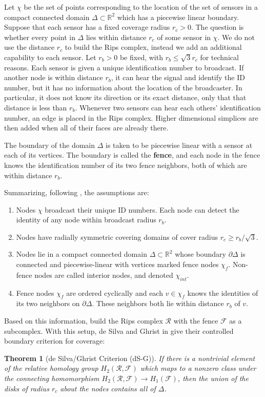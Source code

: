 \documentclass[10pt,twocolumn]{article} \usepackage{amsmath,epsf,amssymb,cite,pifont,amsthm, mathrsfs,epsfig,  bbm, amsthm,  setspace}
\newtheorem{thm}{Theorem}
\newcommand{\R}{\mathbb R}
\renewcommand{\1}{\mathbbm{1}}
\begin{document}
Let   $\chi$ be the set of points corresponding to the location of the set of sensors in a compact connected domain $\Delta\subset \R^2$
which has a piecewise linear boundary.
Suppose that each sensor has a fixed coverage radius $r_c > 0$.
The question is whether every point in $\Delta $ lies within distance $r_c$ of some sensor in $\chi$.
We do not use the distance $r_c$ to build the Rips complex, instead we add an additional capability to each sensor.
Let $r_b > 0$ be fixed, with $r_b \leq \sqrt{3} r_c$ for technical reasons.
Each sensor is given a unique identification number to broadcast.
If another node is within distance $r_b$, it can hear the signal and identify the ID
number, but it has no information about the location of the broadcaster.
In particular, it does not know its direction or its exact distance,  only that that distance
is less than $r_b$.
Whenever two sensors can hear each others' identification number, an edge is
placed in the Rips complex.
Higher dimensional simplices are then added when all of their faces are already there.

The boundary of the domain $\Delta$ is taken to be
piecewise linear with a sensor at each of its vertices.
The boundary is called the
 \textbf{fence}, and
each  node in the fence knows the identification number of its two
fence neighbors, both of which are  within distance $r_b$.

Summarizing, following \cite{DeSilva2006},
 the assumptions are:
\begin{enumerate}
	\item Nodes $\chi$ broadcast their unique ID numbers.
	          Each node can detect the identity of any node within broadcast radius $r_b$.
	\item Nodes have radially symmetric covering domains of cover radius $r_c \geq r_b/\sqrt{3}$.
	\item Nodes lie in a compact connected domain $\Delta \subset \R^2$ whose boundary
	         $\partial \Delta $ is connected and piecewise-linear with vertices marked fence
	         nodes $\chi_f$.
		  Non-fence nodes are called interior nodes,  and denoted $\chi_{int}$.
	\item Fence nodes $\chi_f$ are ordered cyclically and each $v \in \chi_f$ knows the
	        identities of its two neighbors on $\partial \Delta $.
	        These neighbors both lie within distance $r_b$ of $v$.
\end{enumerate}
Based on this information, build the Rips complex $\mathcal{R}$ with the fence $\mathcal{F}$ as a subcomplex.
With this setup, de Silva and Ghrist in \cite{DeSilva2006}
give their controlled boundary criterion for coverage:
\begin{thm}[de Silva/Ghrist Criterion (dS-G)] \label{Criterion}
   If there is a nontrivial element of the relative homology group
   $H_2(\mathcal{R}, \mathcal{F})$ which maps to a nonzero class under the
   connecting homomorphism $H_2(\mathcal{R}, \mathcal{F}) \to H_1(\mathcal{F})$,
   then the union of the disks of radius $r_c$ about the nodes contains all of $\Delta $.
\end{thm}
\end{document}
